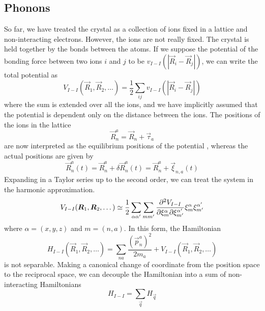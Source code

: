 \subsection{Phonons} \label{sec:phonons}
So far, we have treated the crystal as a collection of ions fixed in a lattice and non-interacting electrons. However, the ions are not really fixed. The crystal is held together by the bonds between the atoms. If we suppose the potential of the bonding force between two ions $i$ and $j$ to be $v_{I-I}(|\vec{R}_i - \vec{R}_j|)$, we can write the total potential as
\begin{equation} \label{eq:ion_ion_potential}
    V_{I-I}(\vec{R}_1, \vec{R}_2, \dots) = \frac{1}{2} \sum_{ij} v_{I-I}(|\vec{R}_i - \vec{R}_j|)
\end{equation}
where the sum is extended over all the ions, and we have implicitly assumed that the potential is dependent only on the distance between the ions. The positions of the ions in the lattice
\begin{equation}
    \vec{R}_n^a = \vec{R}_n + \vec{\tau}_a
\end{equation}
are now interpreted as the equilibrium positions of the potential , whereas the actual positions are given by
\begin{equation} \label{eq:atom_position_perturbed}
    \vec{R}_n^a(t) = \vec{R}_n^a + \delta \vec{R}_n^a(t) = \vec{R}_n^a + \vec{\xi}_{n,a}(t)
\end{equation}
Expanding  in a Taylor series up to the second order, we can treat the system in the harmonic approximation.
\begin{equation}
    V_{I-I}(\mathbf{\boldsymbol{R}}_1, \mathbf{\boldsymbol{R}}_2, \dots) \simeq \frac{1}{2} \sum_{\alpha \alpha'} \sum_{m m'} \frac{\partial^2 V_{I-I}}{\partial \xi_m^\alpha \partial \xi_{m'}^{\alpha'}} \xi_m^\alpha \xi_{m'}^{\alpha'}
\end{equation}
where $\alpha = (x,y,z)$ and $m = (n,a)$.
In this form, the Hamiltonian
\begin{equation} \label{eq:lattice_hamiltonian}
    H_{I-I}(\vec{R}_1, \vec{R}_2, \dots) = \sum_{na} \frac{(\vec{p}_n^a)^2}{2m_a} + V_{I-I}(\vec{R}_1, \vec{R}_2, \dots)
\end{equation}
is not separable. Making a canonical change of coordinate from the position space to the reciprocal space, we can decouple the Hamiltonian into a sum of non-interacting Hamiltonians
\begin{equation}
    H_{I-I} = \sum_\vec{q} H_\vec{q}
\end{equation}
